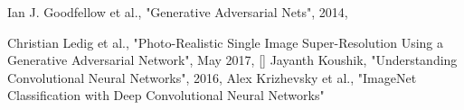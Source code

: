 \documentclass[12pt]{article}
\begin{document}
\begin{thebibliography}{9}

Ian J. Goodfellow et al.,
"Generative Adversarial Nets",
2014,


Christian Ledig et al.,
"Photo-Realistic Single Image Super-Resolution Using a Generative Adversarial
Network",
May 2017,
\ref{}
Jayanth Koushik,
"Understanding Convolutional Neural Networks",
2016,
Alex Krizhevsky et al.,
"ImageNet Classification with Deep Convolutional
Neural Networks"

\end{thebibliography}
\end{document}

